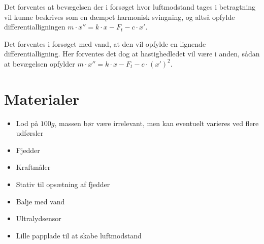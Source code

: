 \documentclass{article} %
\newcounter{source}
\begin{document}
Det forventes at bevægelsen der i forsøget hvor luftmodstand tages i betragtning vil kunne beskrives som en dæmpet harmonisk svingning, og altså opfylde differentialligningen $m\cdot x'' = k \cdot x -F_t - c \cdot x'$.

Det forventes i forsøget med vand, at den vil opfylde en lignende differentialligning. Her forventes det dog at hastighedledet vil være i anden, sådan at bevægelsen opfylder $m\cdot x'' = k \cdot x -F_t - c \cdot (x')^2$.





\pagebreak
\section {Materialer}

\begin{itemize}
	\item Lod på $100g$, massen bør være irrelevant, men kan eventuelt varieres ved flere udførsler
	\item Fjedder
	\item Kraftmåler
	\item Stativ til opsætning af fjedder
	\item Balje med vand
	\item Ultralydsensor
	\item Lille papplade til at skabe luftmodstand
	 
\end{itemize}







\end{document}
